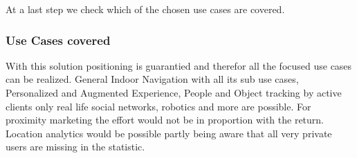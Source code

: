 At a last step we check which of the chosen use cases are covered.

\subsubsection{Use Cases covered}
With this solution positioning is guarantied and therefor all the focused use cases can be realized. General Indoor Navigation with all its sub use cases, Personalized and Augmented Experience, People and Object tracking by active clients only real life social networks, robotics and more are possible. For proximity marketing the effort would not be in proportion with the return. Location analytics would be possible partly being aware that all very private users are missing in the statistic. 
